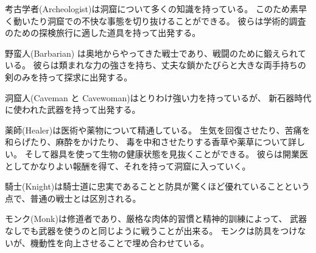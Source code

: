 \blist{}
\item[\bb{Archeologists}]%
考古学者(Archeologist)は洞窟について多くの知識を持っている。
このため素早く動いたり洞窟での不快な事態を切り抜けることができる。
彼らは学術的調査のための探検旅行に適した道具を持って出発する。
\item[\bb{Barbarians}]%
野蛮人(Barbarian) は奥地からやってきた戦士であり、戦闘のために鍛えられている。
彼らは類まれな力の強さを持ち、丈夫な鎖かたびらと大きな両手持ちの
剣のみを持って探求に出発する。
\item[\bb{Cavemen {\rm and} Cavewomen}]
洞窟人(Caveman と Cavewoman)はとりわけ強い力を持っているが、
新石器時代に使われた武器を持って出発する。
\item[\bb{Healers}]%
薬師(Healer)は医術や薬物について精通している。
生気を回復させたり、苦痛を和らげたり、麻酔をかけたり、
毒を中和させたりする香草や薬草について詳しい。
そして器具を使って生物の健康状態を見抜くことができる。
彼らは開業医としてかなりよい報酬を得て、それを持って洞窟に入っていく。
\item[\bb{Knights}]%
騎士(Knight)は騎士道に忠実であることと防具が驚くほど優れていることという
点で、普通の戦士とは区別される。
\item[\bb{Monks}]%
モンク(Monk)は修道者であり、厳格な肉体的習慣と精神的訓練によって、
武器なしでも武器を使うのと同じように戦うことが出来る。
モンクは防具をつけないが、機動性を向上させることで埋め合わせている。
